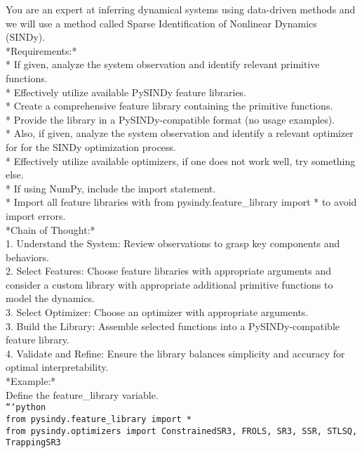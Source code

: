 \documentclass{article}
\begin{document}
\begin{prompt}[H]
\begin{tcolorbox}[promptbox, width=\textwidth]
\small
You are an expert at inferring dynamical systems using data-driven methods and we will use a method called Sparse Identification of Nonlinear Dynamics (SINDy).\\
*Requirements:*\\
* If given, analyze the system observation and identify relevant primitive functions.\\
* Effectively utilize available PySINDy feature libraries.\\
* Create a comprehensive feature library containing the primitive functions.\\
* Provide the library in a PySINDy-compatible format (no usage examples).\\
* Also, if given, analyze the system observation and identify a relevant optimizer for for the SINDy optimization process.\\
* Effectively utilize available optimizers, if one does not work well, try something else.\\
* If using NumPy, include the import statement.\\
* Import all feature libraries with from pysindy.feature\_library import * to avoid import errors.\\
*Chain of Thought:*\\
1. Understand the System: Review observations to grasp key components and behaviors.\\
2. Select Features: Choose feature libraries with appropriate arguments and consider a custom library with appropriate additional primitive functions to model the dynamics.\\
3. Select Optimizer: Choose an optimizer with appropriate arguments.\\
3. Build the Library: Assemble selected functions into a PySINDy-compatible feature library.\\
4. Validate and Refine: Ensure the library balances simplicity and accuracy for optimal interpretability.\\
*Example:*\\
Define the feature\_library variable.\\
\texttt{```python}\\
\texttt{from pysindy.feature\_library import *}\\
\texttt{from pysindy.optimizers import ConstrainedSR3, FROLS, SR3, SSR, STLSQ, TrappingSR3}\\

\end{tcolorbox}
\end{prompt}
\end{document}
